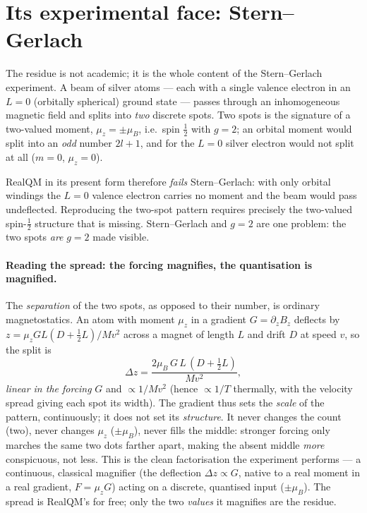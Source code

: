 \documentclass[11pt]{article}
\begin{document}
\section{Its experimental face: Stern--Gerlach}
\label{sec:sg}

The residue is not academic; it is the whole content of the Stern--Gerlach experiment. A beam of silver
atoms --- each with a single valence electron in an $L=0$ (orbitally spherical) ground state --- passes
through an inhomogeneous magnetic field and splits into \emph{two} discrete spots. Two spots is the
signature of a two-valued moment, $\mu_z=\pm\mu_B$, i.e.\ spin $\tfrac12$ with $g=2$; an orbital moment
would split into an \emph{odd} number $2l+1$, and for the $L=0$ silver electron would not split at all
($m=0$, $\mu_z=0$).

RealQM in its present form therefore \emph{fails} Stern--Gerlach: with only orbital windings the $L=0$
valence electron carries no moment and the beam would pass undeflected. Reproducing the two-spot pattern
requires precisely the two-valued spin-$\tfrac12$ structure that is missing. Stern--Gerlach and $g=2$ are
one problem: the two spots \emph{are} $g=2$ made visible.

\paragraph{Reading the spread: the forcing magnifies, the quantisation is magnified.} The \emph{separation} of
the two spots, as opposed to their number, is ordinary magnetostatics. An atom with moment $\mu_z$ in a gradient
$G=\partial_z B_z$ deflects by $z=\mu_z G L(D+\tfrac12 L)/Mv^2$ across a magnet of length $L$ and drift $D$ at
speed $v$, so the split is
\begin{equation}
\Delta z = \frac{2\mu_B\,G\,L\,(D+\tfrac12 L)}{M v^2},
\label{eq:spread}
\end{equation}
\emph{linear in the forcing} $G$ and $\propto 1/Mv^2$ (hence $\propto 1/T$ thermally, with the velocity spread
giving each spot its width). The gradient thus sets the \emph{scale} of the pattern, continuously; it does not
set its \emph{structure}. It never changes the count (two), never changes $\mu_z$ ($\pm\mu_B$), never fills the
middle: stronger forcing only marches the same two dots farther apart, making the absent middle \emph{more}
conspicuous, not less. This is the clean factorisation the experiment performs --- a continuous, classical
magnifier (the deflection $\Delta z\propto G$, native to a real moment in a real gradient, $F=\mu_z G$) acting on
a discrete, quantised input ($\pm\mu_B$). The spread is RealQM's for free; only the two \emph{values} it magnifies
are the residue.
\end{document}
